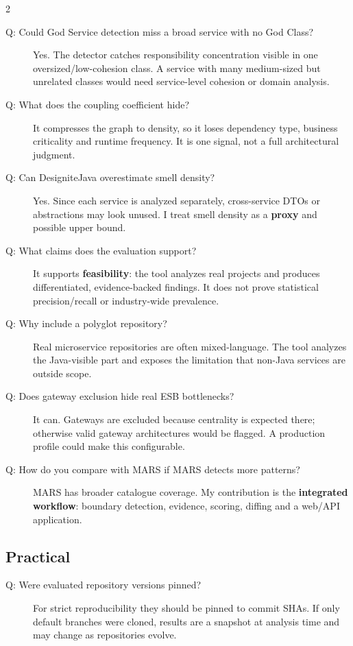 \documentclass[10pt,a4paper]{article}
\begin{document}
\begin{multicols}{2}
\begin{description}
    \item[Q: Could God Service detection miss a broad service with no God Class?]
    Yes. The detector catches responsibility concentration visible in one oversized/low-cohesion class. A service with many medium-sized but unrelated classes would need service-level cohesion or domain analysis.

    \item[Q: What does the coupling coefficient hide?]
    It compresses the graph to density, so it loses dependency type, business criticality and runtime frequency. It is one signal, not a full architectural judgment.

    \item[Q: Can DesigniteJava overestimate smell density?]
    Yes. Since each service is analyzed separately, cross-service DTOs or abstractions may look unused. I treat smell density as a \textbf{proxy} and possible upper bound.

    \item[Q: What claims does the evaluation support?]
    It supports \textbf{feasibility}: the tool analyzes real projects and produces differentiated, evidence-backed findings. It does not prove statistical precision/recall or industry-wide prevalence.

    \item[Q: Why include a polyglot repository?]
    Real microservice repositories are often mixed-language. The tool analyzes the Java-visible part and exposes the limitation that non-Java services are outside scope.

    \item[Q: Does gateway exclusion hide real ESB bottlenecks?]
    It can. Gateways are excluded because centrality is expected there; otherwise valid gateway architectures would be flagged. A production profile could make this configurable.

    \item[Q: How do you compare with MARS if MARS detects more patterns?]
    MARS has broader catalogue coverage. My contribution is the \textbf{integrated workflow}: boundary detection, evidence, scoring, diffing and a web/API application.
\end{description}

\subsection{Practical}

\begin{description}
    \item[Q: Were evaluated repository versions pinned?]
    For strict reproducibility they should be pinned to commit SHAs. If only default branches were cloned, results are a snapshot at analysis time and may change as repositories evolve.


\end{description}
\end{multicols}
\end{document}
